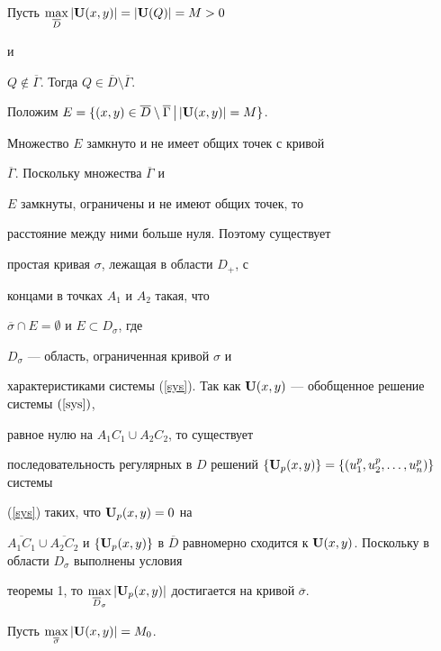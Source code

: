 \begin{pf}


Пусть $\max\limits_{\overline D}|{\bold U}(x,y)|=|{\bold U}(Q)|=M>0$


и


$Q\notin \overline{\Gamma}$. Тогда $Q\in \overline D


\setminus\overline\Gamma$.


Положим $E=\{(x,y)\in \overline D


\setminus\overline\Gamma\,\big| \,|{\bold U}(x,y)|=M\}$.


Множество $E$ замкнуто и не имеет общих точек с кривой


$\overline\Gamma$. Поскольку множества $\overline\Gamma$ и


$E$ замкнуты, ограничены и не имеют общих точек, то


расстояние между ними больше нуля. Поэтому существует


простая кривая $\sigma$, лежащая в области $D_+$, с


концами в точках $A_1$ и $A_2$ такая, что


$\overline\sigma\cap E=\emptyset$ и $E\subset D_{\sigma}$, где


$D_{\sigma}$ --- область, ограниченная кривой $\sigma$ и


характеристиками системы (\ref{sys}). Так как ${\bold


U}(x,y)$ --- обобщенное решение системы $(\ref{sys})$,


равное нулю на $A_1C_1\cup A_2C_2$, то существует


последовательность регулярных в $D$ решений $\{{\bold


U}_p(x,y)\}=\{(u_1^p,u_2^p,\dotsc,u_n^p)\}$ системы


(\ref{sys}) таких, что ${\bold U}_{p}(x,y)=0$ на


$\overline{A_1C_1}\cup \overline{A_2C_2}$ и $\{{\bold


U}_{p}(x,y)\}$ в $\overline D$ равномерно сходится к ${\bold


U}(x,y)$. Поскольку в области $D_\sigma$ выполнены условия


теоремы 1, то $\max\limits_{\overline D_\sigma}|{\bold


U}_{p}(x,y)|$ достигается на кривой $\overline\sigma$.





Пусть $\max\limits_{\overline \sigma}|{\bold U}(x,y)|=M_0$.



\end{pf}
